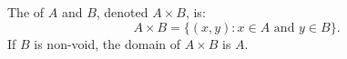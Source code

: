 The  of $A$ and $B$, denoted $A \times B$, is:
$$
A \times B = \{(x,y): x \in A \text{ and } y \in B\}.
$$
If $B$ is non-void, the domain of $A \times B$ is $A$.
